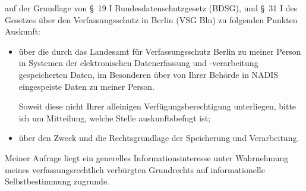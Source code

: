 auf der Grundlage von §~19 I Bundesdatenschutzgesetz (BDSG),
und §~31 I des Gesetzes über den Verfassungsschutz in Berlin (VSG Bln)
zu folgenden Punkten Auskunft:

\begin{itemize}
  \item über die durch das Landesamt für Verfassungsschutz Berlin zu meiner Person
  in Systemen der elektronischen Datenerfassung und -verarbeitung gespeicherten
  Daten, im Besonderen über von Ihrer Behörde in NADIS eingespeiste Daten zu meiner
  Person.

  Soweit diese nicht Ihrer alleinigen Verfügungsberechtigung unterliegen, bitte
  ich um Mitteilung, welche Stelle auskunftsbefugt ist;

  \item über den Zweck und die Rechtsgrundlage der Speicherung und Verarbeitung.
\end{itemize}

Meiner Anfrage liegt ein generelles Informationsinteresse unter Wahrnehmung
meines verfassungsrechtlich verbürgten Grundrechts auf informationelle
Selbstbestimmung zugrunde.
